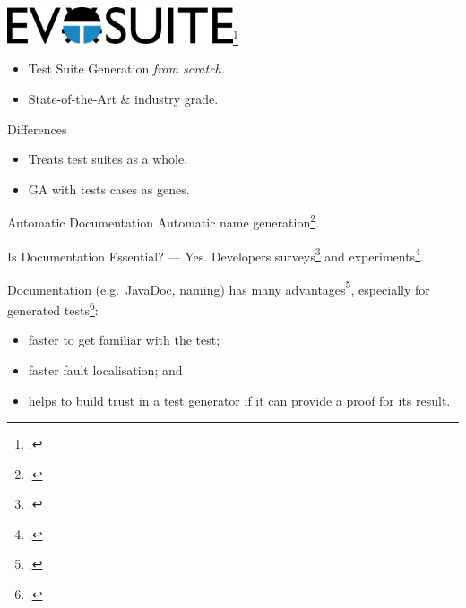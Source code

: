\documentclass[aspectratio=169,dvipsnames]{beamer}
\begin{document}
\begin{frame}
  \begin{center}
      \includegraphics[width=0.5\textwidth]{evosuite-logo}\footcite{fraser2011evosuite}
  \end{center}
  \begin{itemize}
    \item Test Suite Generation \emph{from scratch}.
    \item State-of-the-Art \& industry grade.
  \end{itemize}

  \vfill

  \begin{block}{Differences}
    \begin{itemize}
      \item Treats test suites as a whole.
      \item GA with tests cases as genes.
    \end{itemize}
  \end{block}

  \begin{block}{Automatic Documentation}
    Automatic name generation\footcite{daka2017generating}.
  \end{block}
\end{frame}

\begin{frame}{Is Documentation Essential? --- Yes.}
  Developers surveys\footcite{daka2014survey,prado2015wap,prado2016advances,prado2018towards,li2016automatically} and experiments\footcite{panichella2016impact}.

  Documentation (e.g.\ JavaDoc, naming) has many advantages\footcite{daka2017generating}, especially for generated tests\footcite{rojas2017search,shamshiri2018how}:
  \begin{itemize}
    \item faster to get familiar with the test;
    \item faster fault localisation; and
    \item helps to build trust in a test generator if it can provide a proof for its result.
  \end{itemize}
\end{frame}
\end{document}
